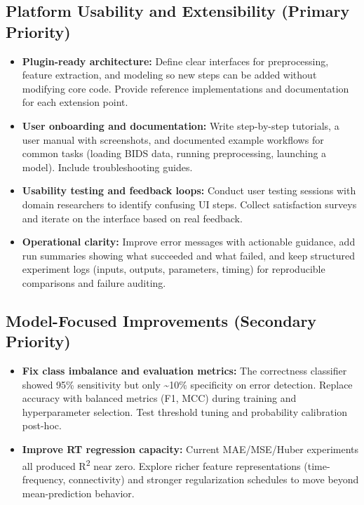 \subsection*{Platform Usability and Extensibility (Primary Priority)}
\begin{itemize}
    \item \textbf{Plugin-ready architecture:} Define clear interfaces for preprocessing, feature extraction, and modeling so new steps can be added without modifying core code. Provide reference implementations and documentation for each extension point.
    \item \textbf{User onboarding and documentation:} Write step-by-step tutorials, a user manual with screenshots, and documented example workflows for common tasks (loading BIDS data, running preprocessing, launching a model). Include troubleshooting guides.
    \item \textbf{Usability testing and feedback loops:} Conduct user testing sessions with domain researchers to identify confusing UI steps. Collect satisfaction surveys and iterate on the interface based on real feedback.
    \item \textbf{Operational clarity:} Improve error messages with actionable guidance, add run summaries showing what succeeded and what failed, and keep structured experiment logs (inputs, outputs, parameters, timing) for reproducible comparisons and failure auditing.
\end{itemize}

\subsection*{Model-Focused Improvements (Secondary Priority)}
\begin{itemize}
    \item \textbf{Fix class imbalance and evaluation metrics:} The correctness classifier showed 95\% sensitivity but only \textasciitilde 10\% specificity on error detection. Replace accuracy with balanced metrics (F1, MCC) during training and hyperparameter selection. Test threshold tuning and probability calibration post-hoc.
    \item \textbf{Improve RT regression capacity:} Current MAE/MSE/Huber experiments all produced R\textsuperscript{2} near zero. Explore richer feature representations (time-frequency, connectivity) and stronger regularization schedules to move beyond mean-prediction behavior.
\end{itemize}
